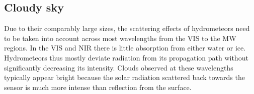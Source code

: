 %
%
%
%

\subsection{Cloudy sky}

Due to their comparably large sizes, the scattering effects of hydrometeors need
to be taken into account across most wavelengths from the VIS to the MW regions.
In the VIS and NIR there is little absorption from either water or ice.
Hydrometeors thus mostly deviate radiation from its propagation path without
significantly decreasing its intensity. Clouds observed at these wavelengths
typically appear bright because the solar radiation  scattered back towards
the sensor is much more intense than reflection from the surface.

